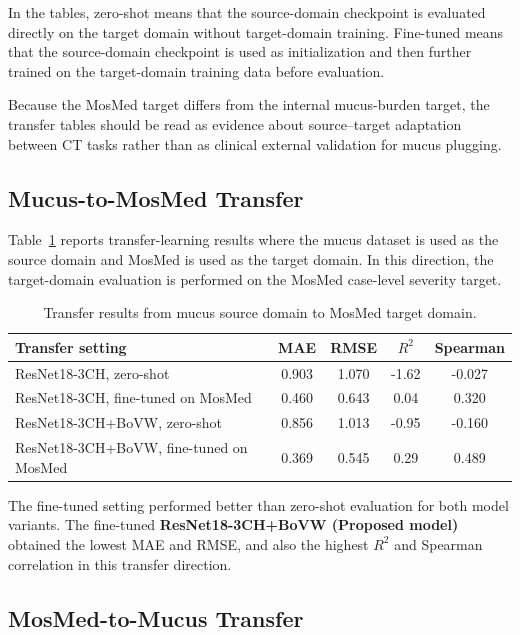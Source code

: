 In the tables, zero-shot means that the source-domain checkpoint is evaluated directly on the target domain without target-domain training. Fine-tuned means that the source-domain checkpoint is used as initialization and then further trained on the target-domain training data before evaluation.

Because the MosMed target differs from the internal mucus-burden target, the transfer tables should be read as evidence about source--target adaptation between CT tasks rather than as clinical external validation for mucus plugging.


\subsection{Mucus-to-MosMed Transfer}
\label{sec:mucus_to_mosmed_transfer}

Table~\ref{tab:transfer_mosmed_target} reports transfer-learning results where the mucus dataset is used as the source domain and MosMed is used as the target domain. In this direction, the target-domain evaluation is performed on the MosMed case-level severity target.

\begin{table}[H]
\centering
\caption{Transfer results from mucus source domain to MosMed target domain.}
\label{tab:transfer_mosmed_target}
\begin{tabular}{lcccc}
\toprule
Transfer setting & MAE & RMSE & \(R^2\) & Spearman \\
\midrule
ResNet18-3CH, zero-shot & 0.903 & 1.070 & -1.62 & -0.027 \\
ResNet18-3CH, fine-tuned on MosMed & 0.460 & 0.643 & 0.04 & 0.320 \\
ResNet18-3CH+BoVW, zero-shot & 0.856 & 1.013 & -0.95 & -0.160 \\
ResNet18-3CH+BoVW, fine-tuned on MosMed & 0.369 & 0.545 & 0.29 & 0.489 \\
\bottomrule
\end{tabular}
\end{table}

The fine-tuned setting performed better than zero-shot evaluation for both model variants. The fine-tuned \textbf{ResNet18-3CH+BoVW (Proposed model)} obtained the lowest MAE and RMSE, and also the highest \(R^2\) and Spearman correlation in this transfer direction.


\subsection{MosMed-to-Mucus Transfer}
\label{sec:mosmed_to_mucus_transfer}

